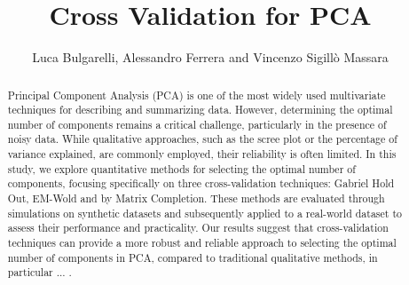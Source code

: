 \documentclass{article}
\begin{document}
\title{Cross Validation for PCA}
\author{Luca Bulgarelli, Alessandro Ferrera and Vincenzo Sigillò Massara}
\date{}

\maketitle

\begin{abstract}
Principal Component Analysis (PCA) is one of the most widely used multivariate techniques for describing and summarizing data. 
However, determining the optimal number of components remains a critical challenge, particularly in the presence of noisy data. 
While qualitative approaches, such as the scree plot or the percentage of variance explained, are commonly employed, their reliability is often limited. 
In this study, we explore quantitative methods for selecting the optimal number of components, focusing specifically on three cross-validation techniques: 
Gabriel Hold Out, EM-Wold and by Matrix Completion. 
These methods are evaluated through simulations on synthetic datasets and subsequently applied to a real-world dataset to assess their performance and practicality.
Our results suggest that cross-validation techniques can provide a more robust and reliable approach to selecting the optimal number of components in PCA,
compared to traditional qualitative methods, in particular ... .
\end{abstract}
\end{document}
